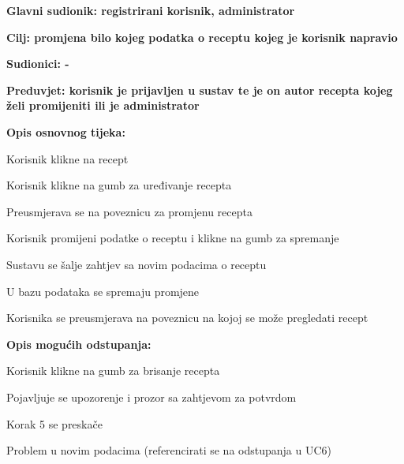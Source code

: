 					\noindent {}
					\begin{packed_item}
						\item \textbf{Glavni sudionik: registrirani korisnik, administrator}
						\item  \textbf{Cilj: promjena bilo kojeg podatka o receptu kojeg je korisnik napravio}
						\item  \textbf{Sudionici: -}
						\item  \textbf{Preduvjet: korisnik je prijavljen u sustav te je on autor recepta kojeg želi promijeniti ili je administrator}
						
						\item  \textbf{Opis osnovnog tijeka:}
						\item[] \begin{packed_enum}
							\item Korisnik klikne na recept
							\item Korisnik klikne na gumb za uređivanje recepta
							\item Preusmjerava se na poveznicu za promjenu recepta
							\item Korisnik promijeni podatke o receptu i klikne na gumb za spremanje
							\item Sustavu se šalje zahtjev sa novim podacima o receptu
							\item U bazu podataka se spremaju promjene
							\item Korisnika se preusmjerava na poveznicu na kojoj se može pregledati recept
						\end{packed_enum}
						
						\item  \textbf{Opis mogućih odstupanja:}
						\item[] \begin{packed_item}							
							\item[4.a] Korisnik klikne na gumb za brisanje recepta
							\begin{packed_enum}
								\item Pojavljuje se upozorenje i prozor sa zahtjevom za potvrdom
								\item Korak 5 se preskače
							\end{packed_enum}
							\item[5.a] Problem u novim podacima (referencirati se na odstupanja u UC6) 
						\end{packed_item}
					\end{packed_item}



